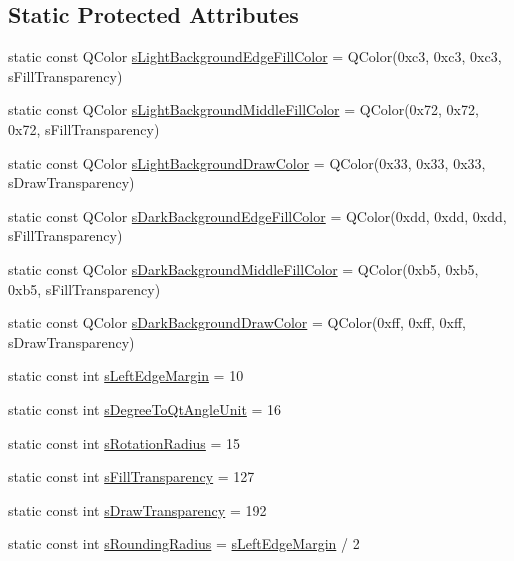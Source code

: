 \subsection*{Static Protected Attributes}
\begin{DoxyCompactItemize}
\item 
static const Q\-Color \hyperlink{class_u_b_abstract_draw_ruler_a23289fe8e275562b9abb4f3264cbfb40}{s\-Light\-Background\-Edge\-Fill\-Color} = Q\-Color(0xc3, 0xc3, 0xc3, s\-Fill\-Transparency)
\item 
static const Q\-Color \hyperlink{class_u_b_abstract_draw_ruler_ad4dcc64c13c7d491f73fbe26d3fee521}{s\-Light\-Background\-Middle\-Fill\-Color} = Q\-Color(0x72, 0x72, 0x72, s\-Fill\-Transparency)
\item 
static const Q\-Color \hyperlink{class_u_b_abstract_draw_ruler_a9d7a6e8677dc8ea83707b7af2d2879d9}{s\-Light\-Background\-Draw\-Color} = Q\-Color(0x33, 0x33, 0x33, s\-Draw\-Transparency)
\item 
static const Q\-Color \hyperlink{class_u_b_abstract_draw_ruler_a9542dab0821f8763d97963476d8e16c5}{s\-Dark\-Background\-Edge\-Fill\-Color} = Q\-Color(0xdd, 0xdd, 0xdd, s\-Fill\-Transparency)
\item 
static const Q\-Color \hyperlink{class_u_b_abstract_draw_ruler_ab274e7ca2eeb2e2f2947af8d920c9389}{s\-Dark\-Background\-Middle\-Fill\-Color} = Q\-Color(0xb5, 0xb5, 0xb5, s\-Fill\-Transparency)
\item 
static const Q\-Color \hyperlink{class_u_b_abstract_draw_ruler_a45fe34ca6300be3f91ec904a97985f8a}{s\-Dark\-Background\-Draw\-Color} = Q\-Color(0xff, 0xff, 0xff, s\-Draw\-Transparency)
\item 
static const int \hyperlink{class_u_b_abstract_draw_ruler_a7462cd58ac10ab7911361ac63dd8cc81}{s\-Left\-Edge\-Margin} = 10
\item 
static const int \hyperlink{class_u_b_abstract_draw_ruler_a68d7e7147ed55b3a197d2fa90a30b84c}{s\-Degree\-To\-Qt\-Angle\-Unit} = 16
\item 
static const int \hyperlink{class_u_b_abstract_draw_ruler_ac6fa2ca97290e4240571b0986de855cc}{s\-Rotation\-Radius} = 15
\item 
static const int \hyperlink{class_u_b_abstract_draw_ruler_ac1c6c55d78cb6754791f657a8de5ef7e}{s\-Fill\-Transparency} = 127
\item 
static const int \hyperlink{class_u_b_abstract_draw_ruler_a052023f4bc0064aa6b1cf72f4e8b1b87}{s\-Draw\-Transparency} = 192
\item 
static const int \hyperlink{class_u_b_abstract_draw_ruler_af6ab3c413950b0276b304a289116728e}{s\-Rounding\-Radius} = \hyperlink{class_u_b_abstract_draw_ruler_a7462cd58ac10ab7911361ac63dd8cc81}{s\-Left\-Edge\-Margin} / 2
\end{DoxyCompactItemize}


